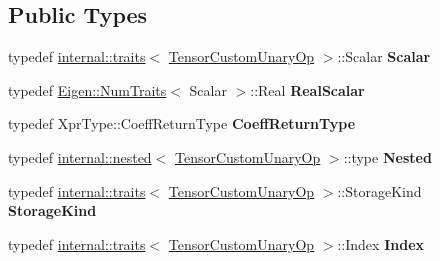 \subsection*{Public Types}
\begin{DoxyCompactItemize}
\item 
\mbox{\label{class_eigen_1_1_tensor_custom_unary_op_ae8eb2ed273d2652d170f154c70dccd3f}} 
typedef \hyperlink{struct_eigen_1_1internal_1_1traits}{internal\+::traits}$<$ \hyperlink{class_eigen_1_1_tensor_custom_unary_op}{Tensor\+Custom\+Unary\+Op} $>$\+::Scalar {\bfseries Scalar}
\item 
\mbox{\label{class_eigen_1_1_tensor_custom_unary_op_a73633ef2e6139bbb43c6a9865ed03964}} 
typedef \hyperlink{group___core___module_struct_eigen_1_1_num_traits}{Eigen\+::\+Num\+Traits}$<$ Scalar $>$\+::Real {\bfseries Real\+Scalar}
\item 
\mbox{\label{class_eigen_1_1_tensor_custom_unary_op_ad6acefeac5ceff680af970a5948caeb0}} 
typedef Xpr\+Type\+::\+Coeff\+Return\+Type {\bfseries Coeff\+Return\+Type}
\item 
\mbox{\label{class_eigen_1_1_tensor_custom_unary_op_afcfa72a53aef34e34516703ed30f0831}} 
typedef \hyperlink{struct_eigen_1_1internal_1_1nested}{internal\+::nested}$<$ \hyperlink{class_eigen_1_1_tensor_custom_unary_op}{Tensor\+Custom\+Unary\+Op} $>$\+::type {\bfseries Nested}
\item 
\mbox{\label{class_eigen_1_1_tensor_custom_unary_op_ae798fe3d7849f5547ca193304f88432e}} 
typedef \hyperlink{struct_eigen_1_1internal_1_1traits}{internal\+::traits}$<$ \hyperlink{class_eigen_1_1_tensor_custom_unary_op}{Tensor\+Custom\+Unary\+Op} $>$\+::Storage\+Kind {\bfseries Storage\+Kind}
\item 
\mbox{\label{class_eigen_1_1_tensor_custom_unary_op_a49d050ac9e7fb37dc18bb03730a89aeb}} 
typedef \hyperlink{struct_eigen_1_1internal_1_1traits}{internal\+::traits}$<$ \hyperlink{class_eigen_1_1_tensor_custom_unary_op}{Tensor\+Custom\+Unary\+Op} $>$\+::Index {\bfseries Index}
\item 

\end{DoxyCompactItemize}
